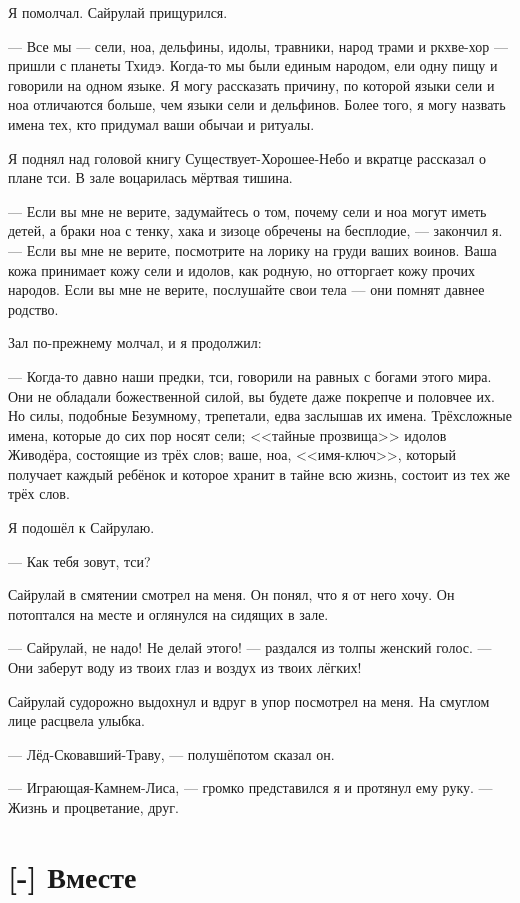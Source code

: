 Я помолчал. Сайрулай прищурился.

--- Все мы --- сели, ноа, дельфины, идолы, травники, народ трами и ркхве-хор --- пришли с планеты Тхидэ.
Когда-то мы были единым народом, ели одну пищу и говорили на одном языке.
Я могу рассказать причину, по которой языки сели и ноа отличаются больше, чем языки сели и дельфинов.
Более того, я могу назвать имена тех, кто придумал ваши обычаи и ритуалы.

Я поднял над головой книгу Существует-Хорошее-Небо и вкратце рассказал о плане тси.
В зале воцарилась мёртвая тишина.

--- Если вы мне не верите, задумайтесь о том, почему сели и ноа могут иметь детей, а браки ноа с тенку, хака и зизоце обречены на бесплодие, --- закончил я.
--- Если вы мне не верите, посмотрите на лорику на груди ваших воинов.
Ваша кожа принимает кожу сели и идолов, как родную, но отторгает кожу прочих народов.
Если вы мне не верите, послушайте свои тела --- они помнят давнее родство.

Зал по-прежнему молчал, и я продолжил:

--- Когда-то давно наши предки, тси, говорили на равных с богами этого мира.
Они не обладали божественной силой, вы будете даже покрепче и половчее их.
Но силы, подобные Безумному, трепетали, едва заслышав их имена.
Трёхсложные имена, которые до сих пор носят сели;
<<тайные прозвища>> идолов Живодёра, состоящие из трёх слов;
ваше, ноа, <<имя-ключ>>, который получает каждый ребёнок и которое хранит в тайне всю жизнь, состоит из тех же трёх слов.

Я подошёл к Сайрулаю.

--- Как тебя зовут, тси?

Сайрулай в смятении смотрел на меня.
Он понял, что я от него хочу.
Он потоптался на месте и оглянулся на сидящих в зале.

--- Сайрулай, не надо!
Не делай этого! --- раздался из толпы женский голос.
--- Они заберут воду из твоих глаз и воздух из твоих лёгких!

Сайрулай судорожно выдохнул и вдруг в упор посмотрел на меня.
На смуглом лице расцвела улыбка.

--- Лёд-Сковавший-Траву, --- полушёпотом сказал он.

--- Играющая-Камнем-Лиса, --- громко представился я и протянул ему руку.
--- Жизнь и процветание, друг.

\section{[-] Вместе}

